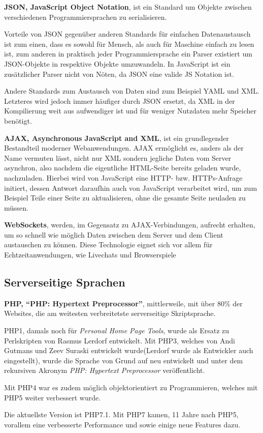 \documentclass[a4paper,12pt]{scrartcl}      %
\let\oldcite\cite
\renewcommand{\cite}[1]{\textsuperscript{\oldcite{#1}}}
\newcommand{\spacer}{\par\bigskip\noindent}
\begin{document}
	\spacer\textbf{JSON, JavaScript Object Notation}, ist ein Standard um Objekte zwischen verschiedenen Programmiersprachen zu serialisieren.\par
	Vorteile von JSON gegenüber anderen Standards für einfachen Datenaustausch ist zum einen, dass es sowohl für Mensch, als auch für Maschine einfach zu lesen ist, zum anderen in praktisch jeder Programmiersprache ein Parser existiert um JSON-Objekte in respektive Objekte umzuwandeln. In JavaScript ist ein zusätzlicher Parser nicht von Nöten, da JSON eine valide JS Notation ist.\cite{json}\par
	Andere Standards zum Austausch von Daten sind zum Beispiel YAML und XML. Letzteres wird jedoch immer häufiger durch JSON ersetzt, da XML in der Kompilierung weit aus aufwendiger ist und für weniger Nutzdaten mehr Speicher benötigt.\par
	
	\spacer\textbf{AJAX, Asynchronous JavaScript and XML}, ist ein grundlegender Bestandteil moderner Webanwendungen. AJAX ermöglicht es, anders als der Name vermuten lässt, nicht nur XML sondern jegliche Daten vom Server asynchron, also nachdem die eigentliche HTML-Seite bereits geladen wurde, nachzuladen. Hierbei wird von JavaScript eine HTTP- bzw. HTTPs-Anfrage initiert, dessen Antwort daraufhin auch von JavaScript verarbeitet wird, um zum Beispiel Teile einer Seite zu aktualisieren, ohne die gesamte Seite neuladen zu müssen.\cite{ajaxWiki}\par
	
	\spacer\textbf{WebSockets}, werden, im Gegensatz zu AJAX-Verbindungen, aufrecht erhalten, um so schnell wie möglich Daten zwischen dem Server und dem Client austauschen zu können. Diese Technologie eignet sich vor allem für Echtzeitanwendungen, wie Livechats und Browserspiele\cite{websocketWiki}\par
	
	\subsection{Serverseitige Sprachen}
	
	\spacer\textbf{PHP, ``PHP: Hypertext Preprocessor''}, mittlerweile, mit über 80\% der Websites, die am weitesten verbreitetste serverseitige Skriptsprache.\cite{phpCoverage}\par
	PHP1, damals noch für \emph{Personal Home Page Tools}, wurde als Ersatz zu Perlskripten von Rasmus Lerdorf entwickelt. Mit PHP3, welches von Andi Gutmans und Zeev Suraski entwickelt wurde(Lerdorf wurde als Entwickler auch eingestellt), wurde die Sprache von Grund auf neu entwickelt und unter dem rekursiven Akronym \emph{PHP: Hypertext Preprocessor} veröffentlicht.\par
	Mit PHP4 war es zudem möglich objektorientiert zu Programmieren, welches mit PHP5 weiter verbessert wurde.\par
	Die aktuellste Version ist PHP7.1. Mit PHP7 kamen, 11 Jahre nach PHP5, vorallem eine verbesserte Performance und sowie einige neue Features dazu.\cite{phpWiki}\par
	
\end{document}
